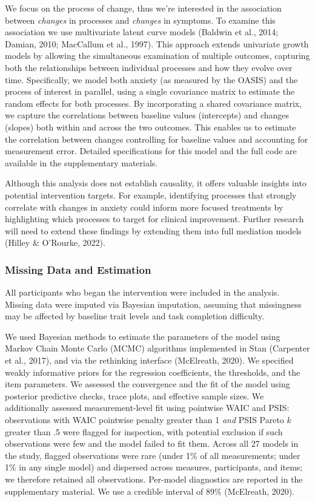 \documentclass[
  man,floatsintext]{apa7}
\begin{document}
We focus on the process of change, thus we're interested in the association between \emph{changes} in processes and \emph{changes} in symptoms.
To examine this association we use multivariate latent curve models (Baldwin et al., 2014; Damian, 2010; MacCallum et al., 1997).
This approach extends univariate growth models by allowing the simultaneous examination of multiple outcomes, capturing both the relationships between individual processes and how they evolve over time.
Specifically, we model both anxiety (as measured by the OASIS) and the process of interest in parallel, using a single covariance matrix to estimate the random effects for both processes.
By incorporating a shared covariance matrix, we capture the correlations between baseline values (intercepts) and changes (slopes) both within and across the two outcomes.
This enables us to estimate the correlation between changes controlling for baseline values and accounting for measurement error.
Detailed specifications for this model and the full code are available in the supplementary materials.

Although this analysis does not establish causality, it offers valuable insights into potential intervention targets.
For example, identifying processes that strongly correlate with changes in anxiety could inform more focused treatments by highlighting which processes to target for clinical improvement.
Further research will need to extend these findings by extending them into full mediation models (Hilley \& O'Rourke, 2022).

\subsubsection{Missing Data and Estimation}\label{missing-data-and-estimation}

All participants who began the intervention were included in the analysis.
Missing data were imputed via Bayesian imputation, assuming that missingness may be affected by baseline trait levels and task completion difficulty.

We used Bayesian methods to estimate the parameters of the model using Markov Chain Monte Carlo (MCMC) algorithms implemented in Stan (Carpenter et al., 2017), and via the rethinking interface (McElreath, 2020).
We specified weakly informative priors for the regression coefficients, the thresholds, and the item parameters.
We assessed the convergence and the fit of the model using posterior predictive checks, trace plots, and effective sample sizes.
We additionally assessed measurement-level fit using pointwise WAIC and PSIS: observations with WAIC pointwise penalty greater than 1 \emph{and} PSIS Pareto \(k\) greater than .5 were flagged for inspection, with potential exclusion if such observations were few and the model failed to fit them.
Across all 27 models in the study, flagged observations were rare (under 1\% of all measurements; under 1\% in any single model) and dispersed across measures, participants, and items; we therefore retained all observations.
Per-model diagnostics are reported in the supplementary material.
We use a credible interval of 89\% (McElreath, 2020).
\end{document}

